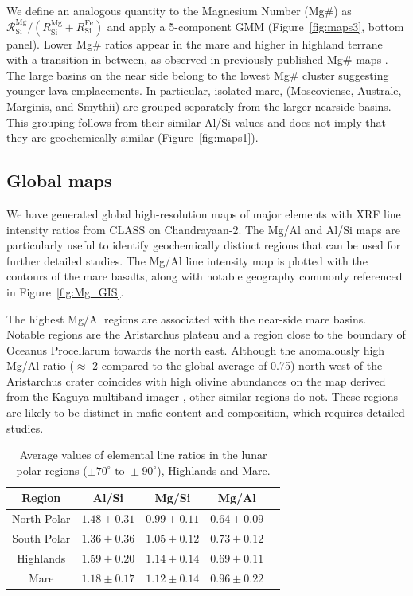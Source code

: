 \documentclass[twocolumn,linenumbers]{aastex631}
\newcommand{\revone}[1]{#1}
\newcommand{\revtwo}[1]{#1}
\begin{document}
We define an analogous quantity to the Magnesium Number (Mg\#) as $\mathcal R^\text{Mg}_\text{Si}/\left({R^\text{Mg}_\text{Si}+R^\text{Fe}_\text{Si}}\right)$  and apply a \revone{5}-component GMM \revone{(Figure~\ref{fig:maps3}, bottom panel)}. Lower Mg\# ratios appear in the mare and higher in highland terrane with a transition \revone{in} between, as observed in previously published Mg\# maps \citep{WANG2021105360,ZHANG2023115505}. The large basins on the near side belong to the lowest Mg\# cluster suggesting younger lava emplacements. In particular, isolated mare, \revtwo{(Moscoviense, Australe, Marginis, and Smythii) are grouped separately from the larger nearside basins. This grouping follows from their similar Al/Si values and does not imply that they are geochemically similar (Figure~\ref{fig:maps1}).}

\subsection{Global maps}

We have generated global high-resolution maps of major elements with XRF line intensity ratios from CLASS on Chandrayaan-2. The Mg/Al and Al/Si maps are particularly useful to identify geochemically distinct regions that can be used for further detailed studies. The Mg/Al line intensity map is plotted with the contours of the mare basalts\revone{, along with notable geography commonly referenced} in Figure~\ref{fig:Mg_GIS}.

The highest Mg/Al regions are associated with the near-side mare basins. Notable regions are the \revone{Aristarchus} plateau and a region close to the boundary of \revone{Oceanus Procellarum} towards the north east. Although the anomalously high Mg/Al ratio ($\approx$ 2 compared to the global average of 0.75) north west of the Aristarchus crater coincides with high olivine abundances on the map derived from the Kaguya multiband imager \citep{2019P&SS..165..230L}, other similar regions do not. These regions are likely to be distinct in mafic content and composition, which requires detailed studies.



\begin{table}[!t]
    \centering
    \begin{tabular}{|c|c|c|c|c|}
        \hline
        Region & Al/Si& Mg/Si& Mg/Al\\ \hline
        North Polar   & $1.48 \pm 0.31$ & $0.99 \pm 0.11$   & $0.64 \pm 0.09$ \\ \hline
        South Polar   & $1.36 \pm 0.36$   & $1.05 \pm 0.12$   & $0.73 \pm 0.12$ \\ \hline
        Highlands & $1.59 \pm 0.20$ & $1.14 \pm 0.14$ & $0.69 \pm 0.11$ \\ \hline
        Mare & $1.18 \pm 0.17$ & $1.12 \pm 0.14$ & $0.96 \pm 0.22$ \\ \hline
    \end{tabular}
    \caption{Average values of elemental line ratios in the lunar polar regions ($\pm70^\circ\text{ to }\pm90^\circ$), Highlands and Mare.}
    \label{tab:average}
\end{table}
\end{document}
